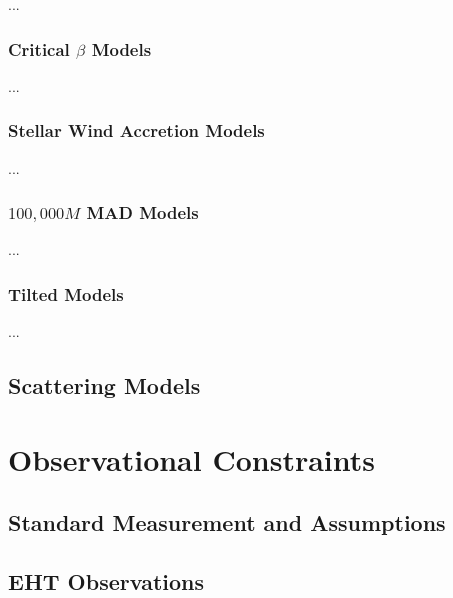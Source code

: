 \documentclass[twocolumn,twocolappendix,tighten,dvipsnames,linenumbers]{aastex63}
\begin{document}
...

\subsubsection{Critical $\beta$ Models}

...

\subsubsection{Stellar Wind Accretion Models}

...

\subsubsection{$100,000M$ MAD Models}

...

\subsubsection{Tilted Models}

...

\subsection{Scattering Models}

\clearpage

\section{Observational Constraints}

\subsection{Standard Measurement and Assumptions}

\subsection{EHT Observations}
\end{document}
